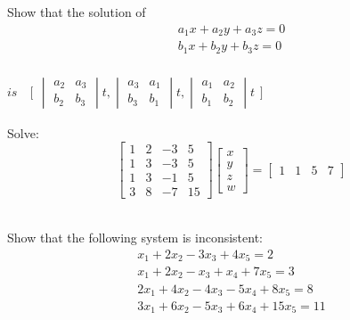 \documentclass[11pt]{amsbook}
\begin{document}
\begin{hEnumerateArabic}
\item Show that the solution of
  \[
  \begin{aligned}
    a_1x + a_2y + a_3z = 0 \\
    b_1x + b_2y + b_3z = 0 \\
  \end{aligned}
  \]

  $
  is \quad
  \lbrack
  \begin{array}{c}
    \begin{vmatrix}
      a_2 & a_3 \\
      b_2 & b_3
    \end{vmatrix}t,

    \begin{vmatrix}
      a_3 & a_1 \\
      b_3 & b_1
    \end{vmatrix}t,

    \begin{vmatrix}
      a_1 & a_2 \\
      b_1 & b_2
    \end{vmatrix}t
  \end{array}
  \rbrack
  $
\\

\item Solve:
  \[
  \begin{bmatrix}
    1 & 2 & -3 & 5 \\
    1 & 3 & -3 & 5 \\
    1 & 3 & -1 & 5 \\
    3 & 8 & -7 & 15
  \end{bmatrix}
  \begin{bmatrix}
    x \\ y \\ z \\ w
  \end{bmatrix}
  =
  \begin{bmatrix}
    1 & 1 & 5 & 7
  \end{bmatrix}
  \]
\\

\item Show that the following system is inconsistent:
  \[
  \begin{aligned}
    x_1 + 2x_2 - 3x_3 + 4x_5 = 2 \\
    x_1 + 2x_2 - x_3 + x_4 + 7x_5 = 3 \\
    2x_1 + 4x_2 - 4x_3 - 5x_4 + 8x_5 = 8 \\
    3x_1 + 6x_2 - 5x_3 + 6x_4 + 15x_5 = 11
  \end{aligned}
  \]

\end{hEnumerateArabic}
\end{document}
